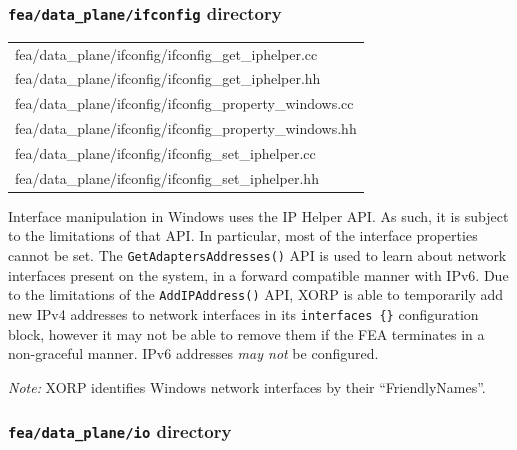 \documentclass[11pt]{article}
\begin{document}
{\subsubsection{{\tt fea/data\_plane/ifconfig} directory}

\begin{center}
\begin{tabular}{|l|}
 \hline
	fea/data\_plane/ifconfig/ifconfig\_get\_iphelper.cc \\
	fea/data\_plane/ifconfig/ifconfig\_get\_iphelper.hh \\
	fea/data\_plane/ifconfig/ifconfig\_property\_windows.cc \\
	fea/data\_plane/ifconfig/ifconfig\_property\_windows.hh \\
	fea/data\_plane/ifconfig/ifconfig\_set\_iphelper.cc \\
	fea/data\_plane/ifconfig/ifconfig\_set\_iphelper.hh \\
 \hline
\end{tabular}
\end{center}

Interface manipulation in Windows uses the IP Helper API. As such,
it is subject to the limitations of that API.
In particular, most of the interface properties cannot be
set.
The {\tt GetAdaptersAddresses()} API is used to learn about
network interfaces present on the system, in a forward
compatible manner with IPv6.
Due to the limitations of the {\tt AddIPAddress()} API, XORP is able
to temporarily add new IPv4 addresses to network
interfaces in its {\tt interfaces \{\}} configuration
block, however it may not be able to remove them if
the FEA terminates in a non-graceful manner.
IPv6 addresses {\em may not} be configured.

{\em Note:} XORP identifies Windows network interfaces
by their ``FriendlyNames''.

\subsubsection{{\tt fea/data\_plane/io} directory}

}
\end{document}
